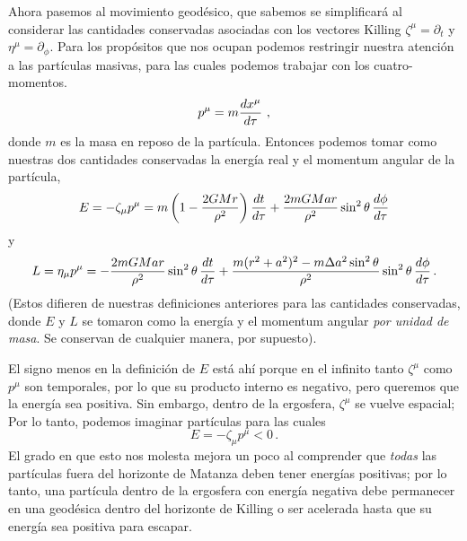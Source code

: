 \documentclass[11pt,b5paper,openany,twoside]{book}
\newcommand{\p}[1]{{\partial_{#1}}}
\begin{document}
Ahora pasemos al movimiento geodésico, que sabemos se simplificará al considerar las cantidades conservadas asociadas con los vectores Killing $\zeta^\mu=\p{t}$ y $\eta^\mu=\p\phi$.
Para los propósitos que nos ocupan podemos restringir nuestra atención a las partículas masivas, para las cuales podemos trabajar con los cuatro-momentos.
\begin{equation}
p^\mu = m {{dx^\mu}\over{d\tau}}\ ,\label{7.135}
\end{equation}
donde $m$ es la masa en reposo de la partícula.
Entonces podemos tomar como nuestras dos cantidades conservadas la energía real y el momentum angular de la partícula,
\begin{equation}
E=-\zeta_\mu p^\mu = m\left(1-{{2GMr}\over {\rho^2}}\right)
{{dt}\over{d\tau}}
+{{2mGMar}\over{\rho^2}}\sin^2\theta\, {{d\phi}\over{d\tau}}\label{7.136}
\end{equation}
y
\begin{equation}
L=\eta_\mu p^\mu=-{{2mGMar}\over{\rho^2}}\sin^2\theta\, {{dt}\over{d\tau}}
+{{m(r^2+a^2)^2 - m\Delta a^2\sin^2\theta}\over{\rho^2}}\sin^2\theta\,
{{d\phi}\over{d\tau}}\,.\label{7.137}
\end{equation}
(Estos difieren de nuestras definiciones anteriores para las cantidades conservadas, donde $E$ y $L$ se tomaron como la energía y el momentum angular {\it por unidad de masa}.
Se conservan de cualquier manera, por supuesto).

El signo menos en la definición de $E$ está ahí porque en el infinito tanto $\zeta^\mu$ como $p^\mu$ son temporales, por lo que su producto interno es negativo, pero queremos que la energía sea positiva.
Sin embargo, dentro de la ergosfera, $\zeta^\mu$ se vuelve espacial; Por lo tanto, podemos imaginar partículas para las cuales
\begin{equation}
E = -\zeta_\mu p^\mu < 0\,.\label{7.138}
\end{equation}
El grado en que esto nos molesta mejora un poco al comprender que \textit{todas} las partículas fuera del horizonte de Matanza deben tener energías positivas; por lo tanto, una partícula dentro de la ergosfera con energía negativa debe permanecer en una geodésica dentro del horizonte de Killing o ser acelerada hasta que su energía sea positiva para escapar.
\end{document}
